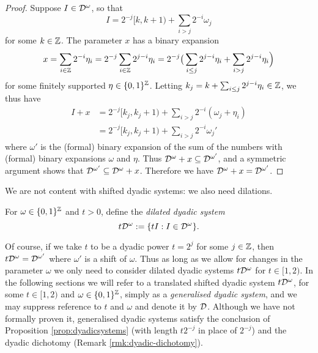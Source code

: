 \begin{proof}
  Suppose $I \in \mathcal{D}^{\omega}$, so that
  \begin{equation*}
    I = 2^{-j}[k, k+1) + \sum_{i > j} 2^{-i} \omega_{j}
  \end{equation*}
  for some $k \in \mathbb{Z}$.
  The parameter $x$ has a binary expansion
  \begin{equation*}
    x = \sum_{i \in \mathbb{Z}} 2^{-i} \eta_{i}
    = 2^{-j} \sum_{i \in \mathbb{Z}} 2^{j-i}\eta_{i}
    = 2^{-j} \big( \sum_{i \leq j} 2^{j-i}\eta_{i} + \sum_{i > j} 2^{j-i}\eta_{i} \Big) 
  \end{equation*}
  for some finitely supported $\eta \in \{0,1\}^{\mathbb{Z}}$.
  Letting $k_{j} = k + \sum_{i \leq j} 2^{j-i} \eta_{i} \in \mathbb{Z}$, we thus have
  \begin{equation*}
    \begin{aligned}
      I + x &= 2^{-j}[k_{j}, k_{j} + 1) + \sum_{i > j} 2^{-i} (\omega_{j} + \eta_{i}) \\
      &= 2^{-j}[k_{j}, k_{j} + 1) + \sum_{i > j} 2^{-i} \omega_{j}'
    \end{aligned}
  \end{equation*}
  where $\omega'$ is the (formal) binary expansion of the sum of the numbers with (formal) binary expansions $\omega$ and $\eta$.
  Thus $\mathcal{D}^{\omega} + x \subseteq \mathcal{D}^{\omega'}$, and a symmetric argument shows that $\mathcal{D}^{\omega'} \subseteq \mathcal{D}^{\omega} + x$.
  Therefore we have $\mathcal{D}^{\omega} + x = \mathcal{D}^{\omega'}$.
\end{proof}

We are not content with shifted dyadic systems: we also need dilations.

\begin{defn}
  For $\omega \in \{0,1\}^{\mathbb{Z}}$ and $t > 0$, define the \emph{dilated dyadic system}
  \begin{equation*}
    t\mathcal{D}^{\omega} := \{tI : I \in \mathcal{D}^{\omega}\}.
  \end{equation*}
\end{defn}

Of course, if we take $t$ to be a dyadic power $t = 2^{j}$ for some $j \in \mathbb{Z}$, then $t\mathcal{D}^{\omega} = \mathcal{D}^{\omega'}$ where $\omega'$ is a shift of $\omega$.
Thus as long as we allow for changes in the parameter $\omega$ we only need to consider dilated dyadic systems $t\mathcal{D}^{\omega}$ for $t \in [1,2)$.
In the following sections we will refer to a translated shifted dyadic system $t\mathcal{D}^{\omega}$, for some $t \in [1,2)$ and $\omega \in \{0,1\}^{\mathbb{Z}}$, simply as a \emph{generalised dyadic system}, and we may suppress reference to $t$ and $\omega$ and denote it by $\mathcal{D}$.
Although we have not formally proven it, generalised dyadic systems satisfy the conclusion of Proposition \ref{prop:dyadicsystems} (with length $t2^{-j}$ in place of $2^{-j}$) and the dyadic dichotomy (Remark \ref{rmk:dyadic-dichotomy}).

